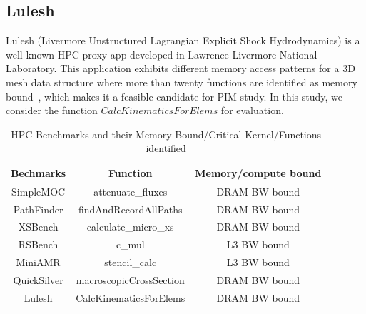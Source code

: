 \subsection{Lulesh}
Lulesh (Livermore Unstructured Lagrangian Explicit Shock Hydrodynamics) is a well-known HPC proxy-app developed in Lawrence Livermore National Laboratory. This application exhibits different memory access patterns for a 3D mesh data structure where more than twenty functions are identified as memory bound~\cite{monil2022mapredict}, which makes it a feasible candidate for PIM study. In this study, we consider the function $CalcKinematicsForElems$ for evaluation.




%
%
\begin{table}[t]
\small
\caption{HPC Benchmarks and their Memory-Bound/Critical Kernel/Functions identified}
\centering
    \begin{tabularx}{\columnwidth}{ccc}
\toprule
    Bechmarks & Function & Memory/compute bound \\
\midrule

SimpleMOC & attenuate\_fluxes & DRAM BW bound \\
PathFinder   & findAndRecordAllPaths & DRAM BW bound \\
XSBench      & calculate\_micro\_xs & DRAM BW bound \\
RSBench      & c\_mul & L3 BW bound \\
MiniAMR      & stencil\_calc & L3 BW bound \\
QuickSilver      & macroscopicCrossSection & DRAM BW bound \\
Lulesh & CalcKinematicsForElems & DRAM BW bound \\
\bottomrule
   \end{tabularx}
\label{table:apps}
\end{table}
%
%
%



